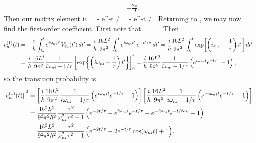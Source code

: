 \begin{solution}
\begin{align*}
		= -\frac{2\pi}{9}.
	\end{align*}
	Then our matrix element is
	\beq
		 = - e^{-t / \tau} 
		= - e^{-t / \tau}.
	\eeq
	 Returning to , we may now find the first-order coefficient.  First note that
	 \beq
	 	\omgni = \frac{\Ew - \Eq}{\hbar}
	 	= .
	 \eeq
	 Then
	 \begin{align*}
	 	c_n^{(1)}(t) &= -\frac{i}{\hbar} \int_{t_0}^t e^{i \omega_{n i} t'} V_{2 1}(t') \dd{t'}
	 	= \frac{i}{\hbar} \frac{16 L^2}{9 \pi^2} \int_0^t e^{i \omega_{n i} t'}  \, e^{-t' / \tau} \dd{t'} 
	 	= \frac{i}{\hbar} \frac{16 L^2}{9 \pi^2} \int_0^t \exp[\left(i \omega_{n i} - \frac{1}{\tau} \right) t'] \dd{t'} \\
	 	&= \frac{i}{\hbar} \frac{16 L^2}{9 \pi^2} \frac{1}{i\omega_{n i} - 1/\tau} \left[ \exp{\left(i \omega_{n i}- \frac{1}{\tau} \right) t'} \right]_0^t
	 	= \frac{i}{\hbar} \frac{16 L^2}{9 \pi^2} \frac{1}{i\omega_{n i} - 1/\tau} \left( e^{i\omega_{n i} t} e^{-t/\tau} - 1 \right),
	 \end{align*}
	 so the transition probability is
	 \begin{align*}
	 	\abs*{c_n^{(1)}(t)}^2 &= \left[ \frac{i}{\hbar} \frac{16 L^2}{9 \pi^2} \frac{1}{i\omega_{n i} - 1/\tau} \left( e^{i\omega_{n i} t} e^{-t/\tau} - 1 \right) \right] \left[ \frac{i}{\hbar} \frac{16 L^2}{9 \pi^2} \frac{1}{i\omega_{n i} + 1/\tau} \left( e^{-i\omega_{n i} t} e^{-t/\tau} - 1 \right) \right] \\
	 	&= \frac{16^2 L^2}{9^2 \pi^2 \hbar^2} \frac{\tau^2}{\omega_{n i}^2 \tau^2 + 1} \left( e^{-2t/\tau} - e^{i\omega_{n i} t} e^{-t/\tau} - e^{-i\omega_{n i} t} e^{-t/tau} + 1 \right) \\
	 	&= \frac{16^2 L^2}{9^2 \pi^2 \hbar^2} \frac{\tau^2}{\omega_{n i}^2 \tau^2 + 1} \left( e^{-2t/\tau} - 2 e^{-t/\tau} \cos(\omega_{n i} t) + 1 \right).
	 \end{align*}
\end{solution}
\vfix
